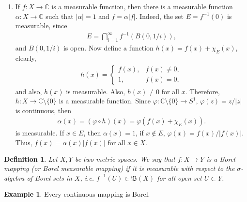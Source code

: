 \documentclass[11pt]{book}
\newtheorem{definition}{Definition}[chapter]
\theoremstyle{definition}
\newtheorem{example}{Example}[chapter]
\numberwithin{equation}{chapter}
\def\BB{\mathfrak{B}}
\begin{document}
\begin{enumerate}[label=(\alph*)]
    \item If $f:X \to \mathbb{C}$ is a measurable function, then there is a measurable function $\alpha: X \to \mathbb{C}$ such that $\left|\alpha\right| = 1$ and $f = \alpha \left|f\right|$. Indeed, the set $E = f^{-1}(0)$ is measurable, since
    \begin{align*}
        E = \bigcap^\infty_{i=1} f^{-1}\left(B\left(0,1/i\right)\right),
    \end{align*}
    and $B\left(0,1/i\right)$ is open. Now define a function $h(x) = f(x) + \chi_E(x)$, clearly,
    \begin{align*}
        h(x) = \begin{cases}
            f(x), & f(x) \neq 0, \\
            1, & f(x) = 0,
        \end{cases}
    \end{align*}
    and also, $h(x)$ is measurable. Also, $h(x) \neq 0$ for all $x$. Therefore, $h:X \to \mathbb{C} \setminus \{0\}$ is a measurable function. Since $\varphi:\mathbb{C} \setminus \{0\} \to S^1$, $\varphi(z) = z/|z|$ is continuous, then 
    \begin{align*}
        \alpha(x) = (\varphi\circ h)(x) = \varphi(f(x) + \chi_E(x)).
    \end{align*}
    is measurable. If $x \in E$, then $\alpha(x) = 1$, if $x \notin E$, $\varphi(x) = f(x)/|f(x)|$. Thus, $f(x) = \alpha(x) |f(x)|$ for all $x \in X$.
\end{enumerate}

\medskip

\begin{definition}\label{def_borel_map}
Let $X,Y$ be two metric spaces. We say that $f:X\to Y$ is a Borel mapping (or Borel measurable mapping) if it is measurable with respect to the $\sigma$-algebra of Borel sets in $X$, i.e. $f^{-1}(U) \in \BB(X)$ for all open set $U \subset Y$.
\end{definition}

\medskip

\begin{example}
Every continuous mapping is Borel.
\end{example}

\medskip
\end{document}
